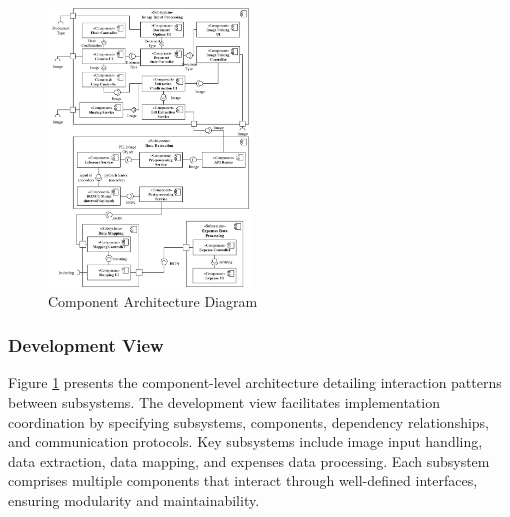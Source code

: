 \begin{figure}[htbp]
    \centering
    \includegraphics[width=0.48\textwidth]{images/component-diagram-eng.png}
    \caption{Component Architecture Diagram}
    \label{fig:component}
\end{figure}


\subsubsection{Development View}

Figure \ref{fig:component} presents the component-level architecture detailing interaction patterns between subsystems. The development view facilitates implementation coordination by specifying subsystems, components, dependency relationships, and communication protocols. Key subsystems include image input handling, data extraction, data mapping, and expenses data processing. Each subsystem comprises multiple components that interact through well-defined interfaces, ensuring modularity and maintainability.


